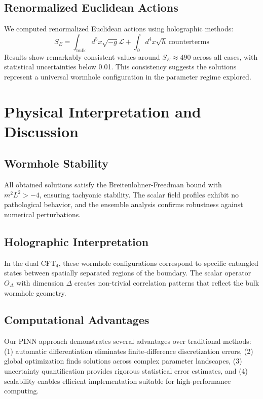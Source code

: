 \documentclass[aps,prd,twocolumn,showpacs,superscriptaddress]{revtex4-1}
\begin{document}
\subsection{Renormalized Euclidean Actions}

We computed renormalized Euclidean actions using holographic methods:
%
\begin{equation}
S_E = \int_{\text{bulk}} d^5x\sqrt{-g}\mathcal{L} + \int_{\partial} d^4x\sqrt{h}\,\text{counterterms}
\end{equation}
%
Results show remarkably consistent values around $S_E \approx 490$ across all cases, with statistical uncertainties below 0.01. This consistency suggests the solutions represent a universal wormhole configuration in the parameter regime explored.

\section{Physical Interpretation and Discussion}

\subsection{Wormhole Stability}

All obtained solutions satisfy the Breitenlohner-Freedman bound with $m^2L^2 > -4$, ensuring tachyonic stability. The scalar field profiles exhibit no pathological behavior, and the ensemble analysis confirms robustness against numerical perturbations.

\subsection{Holographic Interpretation}

In the dual CFT$_4$, these wormhole configurations correspond to specific entangled states between spatially separated regions of the boundary. The scalar operator $O_\Delta$ with dimension $\Delta$ creates non-trivial correlation patterns that reflect the bulk wormhole geometry.

\subsection{Computational Advantages}

Our PINN approach demonstrates several advantages over traditional methods: (1) automatic differentiation eliminates finite-difference discretization errors, (2) global optimization finds solutions across complex parameter landscapes, (3) uncertainty quantification provides rigorous statistical error estimates, and (4) scalability enables efficient implementation suitable for high-performance computing.
\end{document}

